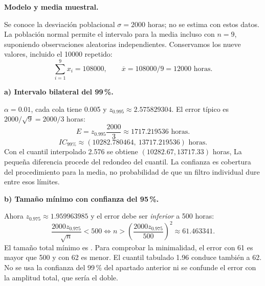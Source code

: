 \textbf{Modelo y media muestral.}\par\nopagebreak[4]
Se conoce la desviación poblacional $\sigma=2000$ horas; no se estima con estos datos. La población normal permite el intervalo para la media incluso con $n=9$, suponiendo observaciones aleatorias independientes. Conservamos los nueve valores, incluido el 10000 repetido:
\[
\sum_{i=1}^9 x_i=108000,\qquad \overline x=108000/9=12000\text{ horas}.
\]

\textbf{a) Intervalo bilateral del 99\,\%.}\par\nopagebreak[4]
$\alpha=0.01$, cada cola tiene 0.005 y $z_{0.995}\approx2.575829304$. El error típico es $2000/\sqrt9=2000/3$ horas:
\[
E=z_{0.995}\frac{2000}{3}\approx1717.219536\text{ horas}.
\]
\[
\boxed{IC_{\text{99\%}}\approx(10282.780464,\ 13717.219536)\text{ horas}.}
\]
Con el cuantil interpolado 2.576 se obtiene $(10282.67,13717.33)$ horas, La pequeña diferencia procede del redondeo del cuantil. La confianza es cobertura del procedimiento para la media, no probabilidad de que un filtro individual dure entre esos límites.

\textbf{b) Tamaño mínimo con confianza del 95\,\%.}\par\nopagebreak[4]
Ahora $z_{0.975}\approx1.959963985$ y el error debe ser \emph{inferior} a 500 horas:
\[
\frac{2000z_{0.975}}{\sqrt n}<500
\iff n>\left(\frac{2000z_{0.975}}{500}\right)^2
\approx61.463341.
\]
El tamaño total mínimo es . Para comprobar la minimalidad, el error con 61 es mayor que 500 y con 62 es menor. El cuantil tabulado 1.96 conduce también a 62. No se usa la confianza del 99\,\% del apartado anterior ni se confunde el error con la amplitud total, que sería el doble.
